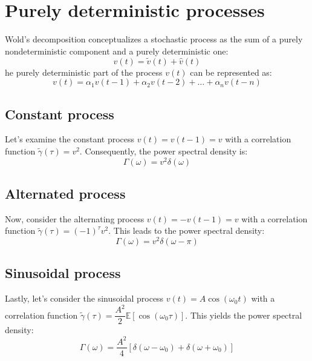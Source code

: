 \section{Purely deterministic processes}

Wold's decomposition conceptualizes a stochastic process as the sum of a purely nondeterministic component and a purely deterministic one:
\[v(t)=\tilde{v}(t)+\hat{v}(t)\]
he purely deterministic part of the process $v(t)$ can be represented as:
\[v(t) = \alpha_1v(t-1) + \alpha_2v(t-2) + \dots + \alpha_nv(t-n)\]

\subsection{Constant process}
Let's examine the constant process $v(t)=v(t-1)=v$ with a correlation function $\tilde{\gamma}(\tau)=v^2$. 
Consequently, the power spectral density is:
\[\Gamma(\omega)=v^2\delta(\omega)\]

\subsection{Alternated process}
Now, consider the alternating process $v(t)=-v(t-1)=v$ with a correlation function $\tilde{\gamma}(\tau)=(-1)^\tau v^2$. 
This leads to the power spectral density:
\[\Gamma(\omega)=v^2\delta(\omega-\pi)\]

\subsection{Sinusoidal process}
Lastly, let's consider the sinusoidal process $v(t)=A\cos(\omega_0 t)$ with a correlation function $\tilde{\gamma}(\tau)=\dfrac{A^2}{2}\mathbb{E}\left[\cos(\omega_0\tau)\right]$. 
This yields the power spectral density:
\[\Gamma(\omega)=\dfrac{A^2}{4}\left[\delta(\omega-\omega_0)+\delta(\omega+\omega_0)\right]\]